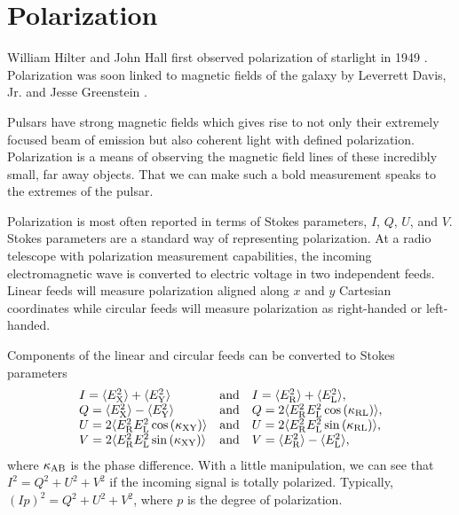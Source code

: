 \section{Polarization}
\label{sec:polarization}

William Hilter and John Hall first observed polarization of starlight in 1949 \citep{hiltner1949polarization,hall1949observations}.
Polarization was soon linked to magnetic fields of the galaxy 
by Leverrett Davis, Jr. and Jesse Greenstein \citep{davis1951polarization}.

Pulsars have strong magnetic fields which gives rise to not only their 
extremely focused beam of emission but also coherent light with 
defined polarization.  
Polarization is a means of observing the magnetic field lines of these incredibly small,
far away objects.  That we can make such a bold measurement speaks to the extremes of the
pulsar.


Polarization is most often reported in terms of Stokes parameters, $I$, $Q$, $U$, and $V$.
Stokes parameters are a standard way of representing polarization.
At a radio telescope with polarization measurement capabilities, the incoming
electromagnetic wave is converted to electric voltage in two independent
feeds.  Linear feeds will measure polarization aligned along $x$ and $y$ Cartesian coordinates
while circular feeds will measure polarization as right-handed or left-handed.

Components of the linear and circular feeds can be converted to Stokes parameters
\begin{equation}
 \begin{array}{lcl}
    I=\langle E_{\rm X}^{2} \rangle + \langle E_{\rm Y}^{2} \rangle &\textrm{and}& I=\langle E_{\rm R}^{2} \rangle + \langle E_{\rm L}^{2} \rangle,\\
    Q=\langle E_{\rm X}^{2} \rangle - \langle E_{\rm Y}^{2} \rangle &\textrm{and}& Q=2\langle E_{\rm R}^{2} E_{\rm L}^{2} \cos {\left(\kappa_{\rm RL}\right)} \rangle,\\
    U=2\langle E_{\rm R}^{2} E_{\rm L}^{2} \cos {\left(\kappa_{\rm XY}\right)} \rangle &\textrm{and}& U=2\langle E_{\rm R}^{2} E_{\rm L}^{2} \sin {\left(\kappa_{\rm RL}\right)} \rangle,\\
    V=2\langle E_{\rm R}^{2} E_{\rm L}^{2} \sin {\left(\kappa_{\rm XY}\right)} \rangle &\textrm{and}& V=\langle E_{\rm R}^{2} \rangle - \langle E_{\rm L}^{2} \rangle,
  \end{array}
\end{equation}
where $\kappa_{\rm AB}$ is the phase difference.
With a little manipulation, we can see that $I^2=Q^2+U^2+V^2$ if the incoming signal is
totally polarized.  Typically, $(Ip)^2=Q^2+U^2+V^2$, where $p$ is the degree of polarization.

